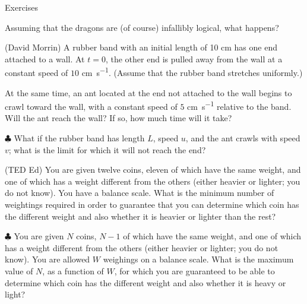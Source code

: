 \begin{xcb}{Exercises}
\begin{exc}
Assuming that the dragons are (of course) infallibly logical, what happens?
\begin{hint}
\end{hint}

\item (David Morrin)  A rubber band with an initial length of 10 cm has one end 
attached to a wall. 
At \(t = 0\), the other end is pulled away from the wall at a constant speed of \(10\) \si{\cm\per\second}. 
(Assume that the rubber band stretches uniformly.) 

At the same time, an ant located at the end not attached to the wall begins to crawl toward
the wall, with a constant speed of \(5\) \si{\cm\per\second} relative to the band. 
Will the ant reach the wall? If so, how much time will it take? 

\(\clubsuit\)  
What if the rubber band has length \(L\), speed \(u\), and the ant crawls with speed 
\(v\); what is the limit for which it will not reach the end?
\begin{hint}
\end{hint}

\item (TED Ed)  You are given twelve coins, eleven of which have the same weight, 
and one of which has a weight different from the others (either heavier or lighter; you do not know). 
You have a balance scale. What is the minimum number of weightings required in order to 
guarantee that you can determine which coin has the different weight and also whether it 
is heavier or lighter than the rest? 

\(\clubsuit\)  You are given \(N\) coins, \(N-1\) of which have the same weight, 
and one of which has a weight different from the others (either heavier or lighter; you do not know). 
You are allowed \(W\) weighings on a balance scale. 
What is the maximum value of \(N\), as a function of \(W\), 
for which you are guaranteed to be able to determine which coin has the different weight and 
also whether it is heavy or light?
\begin{hint}
\end{hint}


\end{exc}
\end{xcb}
